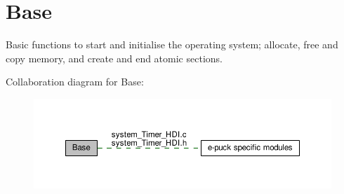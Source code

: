 \hypertarget{group__base}{}\section{Base}
\label{group__base}


Basic functions to start and initialise the operating system; allocate, free and copy memory, and create and end atomic sections.  


Collaboration diagram for Base\+:\nopagebreak
\begin{figure}[H]
\begin{center}
\leavevmode
\includegraphics[width=350pt]{dd/df2/group__base}
\end{center}
\end{figure}
